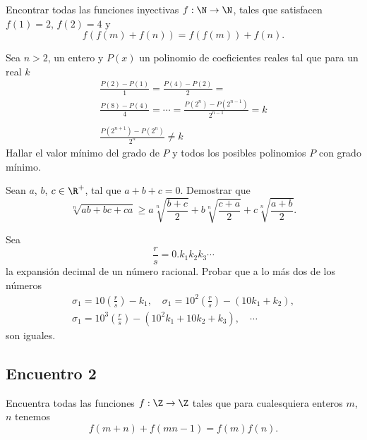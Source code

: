 \begin{section-problem}
    Encontrar todas las funciones inyectivas $f: \N \rightarrow \N$, tales que satisfacen $f(1) = 2$, $f(2) = 4$ y
    \[f(f(m) + f(n)) =  f(f(m)) + f(n).\]
\end{section-problem}

\begin{section-problem}
    Sea $n > 2$, un entero y $P(x)$ un polinomio de coeficientes reales tal que para un real $k$
    \begin{gather*}
        \frac{P(2) - P(1)}{1} = \frac{P(4) - P(2)}{2} =\\
        \frac{P(8) - P(4)}{4} = \cdots = \frac{P(2^n) - P(2^{n - 1})}{2^{n - 1}} = k \\
        \\
        \frac{P(2^{n + 1}) - P(2^n)}{2^n} \neq k
    \end{gather*}
    Hallar el valor mínimo del grado de $P$ y todos los posibles polinomios $P$ con grado mínimo.
\end{section-problem}

\begin{section-problem}
    Sean $a$, $b$, $c \in \R^+$, tal que $a + b + c = 0$.
    Demostrar que
    \[\sqrt[n]{ab + bc + ca} \geq a \sqrt[n]{\frac{b + c}{2}} + b \sqrt[n]{\frac{c + a}{2}} + c \sqrt[n]{\frac{a + b}{2}}.\]
\end{section-problem}

\begin{section-problem}
    Sea
    \[\frac{r}{s} = 0. k_1 k_2 k_3 \cdots\]
    la expansión decimal de un número racional.
    Probar que a lo más dos de los números
    \begin{gather*}
        \sigma_1 = 10 \left(\frac{r}{s}\right) - k_1, \quad
        \sigma_1 = 10^2 \left(\frac{r}{s}\right) - (10 k_1 + k_2),\\
        \sigma_1 = 10^3 \left(\frac{r}{s}\right) - (10^2 k_1 + 10 k_2 + k_3), \quad \cdots
    \end{gather*}
    son iguales.

\end{section-problem}



\subsection{Encuentro 2}

\begin{section-problem}
    Encuentra todas las funciones $f: \Z \rightarrow \Z$ tales que para cualesquiera enteros $m$, $n$ tenemos
    \[f(m + n) + f(mn - 1) = f(m)f(n).\]
\end{section-problem}

